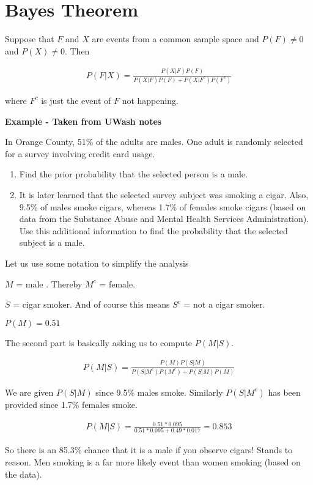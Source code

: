 \documentclass[12pt]{article}
\begin{document}
\section*{Bayes Theorem}

Suppose that $F$ and $X$ are events from a common sample space and $P(F) \neq 0$ and $P(X) \neq 0$. Then

\begin{align*}
P(F|X) = \frac{P(X|F)P(F)}{P(X|F)P(F) + P(X|F^c)P(F^c)}
\end{align*}

where $F^c$ is just the event of $F$ not happening.

\textbf{Example - Taken from UWash notes}

In Orange County, 51\% of the adults are males. One adult is randomly selected
for a survey involving credit card usage.
\begin{enumerate}
\item Find the prior probability that the selected person is a male.
\item It is later learned that the selected survey subject was smoking a cigar. Also, 9.5\%
of males smoke cigars, whereas 1.7\% of females smoke cigars (based on data
from the Substance Abuse and Mental Health Services Administration). Use this
additional information to find the probability that the selected subject is a male.
\end{enumerate}

Let us use some notation to simplify the analysis

$M$ = male . Thereby $M^c$ = female. 

$S$ = cigar smoker. And of course this means $S^c$ = not a cigar smoker.

$P(M) = 0.51$

The second part is basically asking us to compute $P(M|S)$.

\begin{align*}
P(M|S) = \frac{P(M) P(S|M)}{P(S|M^c) P(M^c) + P(S|M) P(M)}
\end{align*}

We are given $P(S|M)$ since 9.5\% males smoke. Similarly $P(S|M^c)$ has been provided since 1.7\% females smoke.

\begin{align*}
P(M|S) = \frac{0.51 * 0.095}{0.51 * 0.095 + 0.49 * 0.017}
= 0.853
\end{align*}

So there is an 85.3\% chance that it is a male if you observe cigars! Stands to reason. Men smoking is a far more likely event than women smoking (based on the data). 
\end{document}
